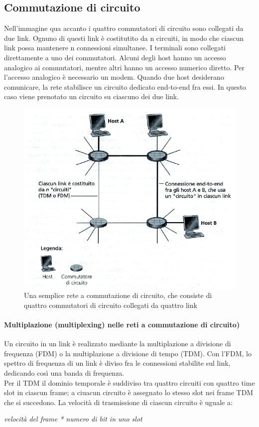 \documentclass[11pt,a4paper]{book}
\begin{document}
\subsection{Commutazione di circuito} \label{par: TDM/FDM}
Nell’immagine qua accanto i quattro commutatori di circuito sono collegati da due link. Ognuno di questi link è costitutito da n circuiti, in modo che ciascun link possa mantenere n connessioni simultanee.
I terminali sono collegati direttamente a uno dei commutatori. Alcuni degli host hanno un accesso analogico ai commutatori, mentre altri hanno un accesso numerico diretto. Per l’accesso analogico è necessario un modem. Quando due host desiderano comunicare, la rete stabilisce un circuito dedicato end-to-end fra essi. In questo caso viene prenotato un circuito su ciascuno dei due link.
\begin{figure}
	\begin{center}
		\includegraphics[scale=0.6]{img/002.png}
		\caption{Una semplice rete a commutazione di circuito, che consiste di quattro commutatori di circuito collegati da quattro link}
	\end{center}
\end{figure}
\paragraph{Multiplazione (multiplexing) nelle reti a commutazione di circuito)} 
Un circuito in un link è realizzato mediante la multiplazione a divisione di frequenza (FDM) o la multiplazione a divisione di tempo (TDM).
Con l’FDM, lo spettro di frequenza di un link è diviso fra le connessioni stabilite sul link, dedicando così una banda di frequenza. \\
Per il TDM il dominio temporale è suddiviso tra quattro circuiti con quattro time slot in ciascun frame; a ciuacun circuito è assegnato lo stesso slot nei frame TDM che si succedono. La velocità di trasmissione di ciascun circuito è uguale a:
\begin{center}
	\textit{velocità del frame * numero di bit in uno slot}
\end{center}
\end{document}

